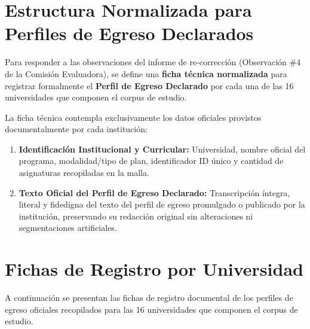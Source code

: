\documentclass[11pt,a4paper]{article}
\begin{document}
\section{\texorpdfstring{\sffamily\color{UsachNavy} Estructura Normalizada para Perfiles de Egreso Declarados}{Estructura Normalizada para Perfiles de Egreso Declarados}}

Para responder a las observaciones del informe de re-corrección (Observación \#4 de la Comisión Evaluadora), se define una \textbf{ficha técnica normalizada} para registrar formalmente el \textbf{Perfil de Egreso Declarado} por cada una de las 16 universidades que componen el corpus de estudio. 

La ficha técnica contempla exclusivamente los datos oficiales provistos documentalmente por cada institución:
\begin{enumerate}[label=\textbf{\arabic*.}, leftmargin=*]
    \item \textbf{Identificación Institucional y Curricular:} Universidad, nombre oficial del programa, modalidad/tipo de plan, identificador ID único y cantidad de asignaturas recopiladas en la malla.
    \item \textbf{Texto Oficial del Perfil de Egreso Declarado:} Transcripción íntegra, literal y fidedigna del texto del perfil de egreso promulgado o publicado por la institución, preservando su redacción original sin alteraciones ni segmentaciones artificiales.
\end{enumerate}

\newpage

\section{\texorpdfstring{\sffamily\color{UsachNavy} Fichas de Registro por Universidad}{Fichas de Registro por Universidad}}

A continuación se presentan las fichas de registro documental de los perfiles de egreso oficiales recopilados para las 16 universidades que componen el corpus de estudio.
\end{document}

